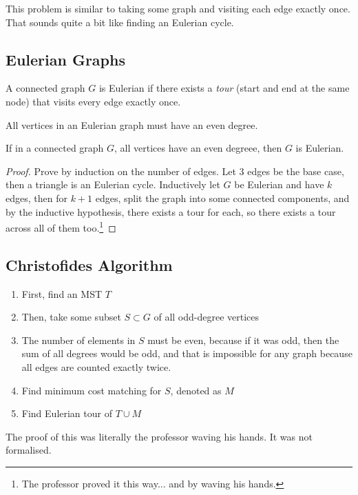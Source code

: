 This problem is similar to taking some graph and visiting each edge exactly once. That sounds quite a bit like finding an Eulerian cycle.

\subsection{Eulerian Graphs}

\begin{definition}
    A connected graph $G$ is Eulerian if there exists a \textit{tour} (start and end at the same node) that visits every edge exactly once.
\end{definition}

\begin{proposition}
    All vertices in an Eulerian graph must have an even degree.
\end{proposition}

\begin{theorem}
    If in a connected graph $G$, all vertices have an even degreee, then $G$ is Eulerian.
\end{theorem}

\begin{proof}
    Prove by induction on the number of edges. Let 3 edges be the base case, then a triangle is an Eulerian cycle. Inductively let $G$ be Eulerian and have $k$ edges, then for $k + 1$ edges, split the graph into some connected components, and by the inductive hypothesis, there exists a tour for each, so there exists a tour across all of them too.\footnote{The professor proved it this way... and by waving his hands.}
\end{proof}

\subsection{Christofides Algorithm}

\begin{enumerate}
    \item First, find an MST $T$
    \item Then, take some subset $S \subset G$ of all odd-degree vertices
    \item The number of elements in $S$ must be even, because if it was odd, then the sum of all degrees would be odd, and that is impossible for any graph because all edges are counted exactly twice.
    \item Find minimum cost matching for $S$, denoted as $M$
    \item Find Eulerian tour of $T \cup M$
\end{enumerate}

The proof of this was literally the professor waving his hands. It was not formalised.
